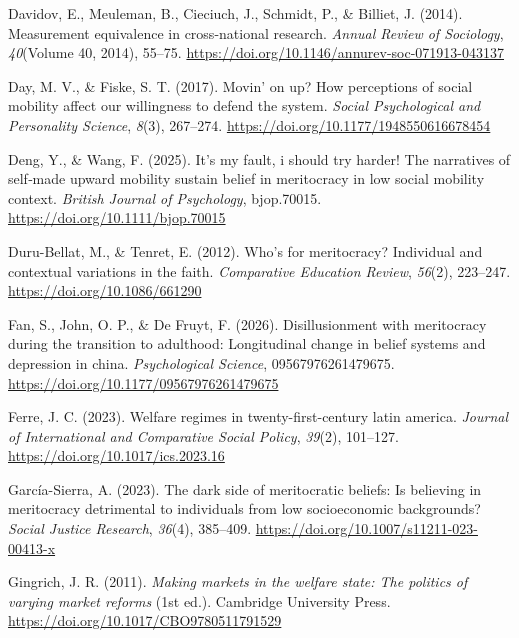 \documentclass[
  13pt,
]{article}
\newlength{\cslhangindent}
\newenvironment{CSLReferences}[2] %
 {\begin{list}{}{%
  \setlength{\itemindent}{0pt}
  \setlength{\leftmargin}{0pt}
  \setlength{\parsep}{0pt}
  \ifodd #1
   \setlength{\leftmargin}{\cslhangindent}
   \setlength{\itemindent}{-1\cslhangindent}
  \fi
  \setlength{\itemsep}{#2\baselineskip}}}
 {\end{list}}
\begin{document}
\begin{CSLReferences}{1}{0}
Davidov, E., Meuleman, B., Cieciuch, J., Schmidt, P., \& Billiet, J.
(2014). Measurement equivalence in cross-national research. \emph{Annual
Review of Sociology}, \emph{40}(Volume 40, 2014), 55--75.
\url{https://doi.org/10.1146/annurev-soc-071913-043137}

Day, M. V., \& Fiske, S. T. (2017). Movin' on up? How perceptions of
social mobility affect our willingness to defend the system.
\emph{Social Psychological and Personality Science}, \emph{8}(3),
267--274. \url{https://doi.org/10.1177/1948550616678454}

Deng, Y., \& Wang, F. (2025). It's my fault, i should try harder! The
narratives of self‐made upward mobility sustain belief in meritocracy in
low social mobility context. \emph{British Journal of Psychology},
bjop.70015. \url{https://doi.org/10.1111/bjop.70015}

Duru-Bellat, M., \& Tenret, E. (2012). Who's for meritocracy? Individual
and contextual variations in the faith. \emph{Comparative Education
Review}, \emph{56}(2), 223--247. \url{https://doi.org/10.1086/661290}

Fan, S., John, O. P., \& De Fruyt, F. (2026). Disillusionment with
meritocracy during the transition to adulthood: Longitudinal change in
belief systems and depression in china. \emph{Psychological Science},
09567976261479675. \url{https://doi.org/10.1177/09567976261479675}

Ferre, J. C. (2023). Welfare regimes in twenty-first-century latin
america. \emph{Journal of International and Comparative Social Policy},
\emph{39}(2), 101--127. \url{https://doi.org/10.1017/ics.2023.16}

García-Sierra, A. (2023). The dark side of meritocratic beliefs: Is
believing in meritocracy detrimental to individuals from low
socioeconomic backgrounds? \emph{Social Justice Research}, \emph{36}(4),
385--409. \url{https://doi.org/10.1007/s11211-023-00413-x}

Gingrich, J. R. (2011). \emph{Making markets in the welfare state: The
politics of varying market reforms} (1st ed.). Cambridge University
Press. \url{https://doi.org/10.1017/CBO9780511791529}


\end{CSLReferences}
\end{document}
